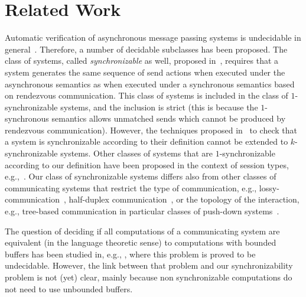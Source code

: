 \section{Related Work}\label{sec:related}

Automatic verification of asynchronous message passing systems is undecidable in general~\cite{DBLP:journals/jacm/BrandZ83}. 
Therefore, a number of decidable subclasses has been proposed. 
The class of systems, called \emph{synchronizable} as well, proposed in~\cite{DBLP:journals/tcs/BasuB16}, requires that a system generates the same sequence of send actions when executed under the asynchronous semantics as when executed under a synchronous semantics based on rendezvous communication. This class of systems is included in the class of $1$-synchronizable systems, and the inclusion is strict (this is because the $1$-synchronous semantics allows unmatched sends which cannot be produced by rendezvous communication). However, the techniques proposed in~\cite{DBLP:journals/tcs/BasuB16} to check that a system is synchronizable according to their definition cannot be extended to $k$-synchronizable systems.
Other classes of systems that are $1$-synchronizable according to our definition have been proposed in the context of session types, e.g.,~\cite{DBLP:conf/esop/DenielouY12,DBLP:journals/jacm/HondaYC16,DBLP:conf/esop/HondaVK98,DBLP:conf/popl/LangeTY15}. 
Our class of synchronizable systems differs also from other classes of communicating systems that restrict the type of communication, e.g., lossy-communication~\cite{DBLP:journals/iandc/AbdullaJ96}, half-duplex communication~\cite{DBLP:journals/iandc/CeceF05}, or the topology of the interaction, e.g., tree-based communication in particular classes of push-down systems~\cite{DBLP:conf/tacas/TorreMP08,DBLP:journals/corr/abs-1209-0359}.

The question of deciding if all computations of a communicating system are equivalent (in the language theoretic sense) to computations with bounded buffers has been studied in, e.g., \cite{DBLP:journals/fuin/GenestKM07}, where this problem is proved to be undecidable. However, the link between that problem and our synchronizability problem is not (yet) clear, mainly because non synchronizable computations do not need to use unbounded buffers.


